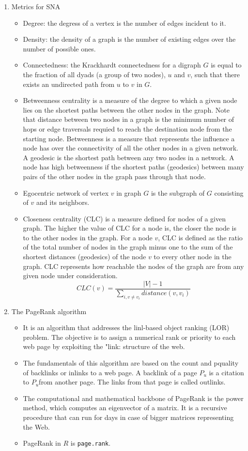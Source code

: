\documentclass[14pt]{article}
\begin{document}
\begin{enumerate}
  \item Metrics for SNA
   \begin{itemize}
    \item Degree: the degress of a vertex is the number of edges incident to it.
    \item Density: the density of a graph is the number of existing edges over the number of possible ones. 
    \item Connectedness: the Krackhardt connectedness for a digraph $G$ is equal to the fraction of all dyads (a group of two nodes), $u$ and $v$, such that there exists an undirected path from $u$ to $v$ in $G$.
    \item Betweenness centrality is a measure of the degree to which a given node lies on the shortest paths between the other nodes in the graph. Note that distance between two nodes in a graph is the minimum number of hops or edge traversals requied to reach the destination node from the starting node. Betweenness is a measure that represents the influence a node has over the connectivity of all the other nodes in a given network. A geodesic is the shortest path between any two nodes in a network. A node has high betweenness if the shortest paths (geodesics) between many pairs of the other nodes in the graph pass through that node. 
    \item Egocentric network of vertex $v$ in graph $G$ is the subgraph of $G$ consisting of $v$ and its neighbors.
    \item Closeness centrality (CLC) is a measure defined for nodes of a given graph. The higher the value of CLC for a node is, the closer the node is to the other nodes in the graph. For a node $v$, CLC is defined as the ratio of the total number of nodes in the graph minus one to the sum of the shortest distances (geodesics) of the node $v$ to every other node in the graph. CLC represents how reachable the nodes of the graph are from any given node under consideration.
    $$ CLC(v) = \frac{|V|-1}{\sum_{i,v \neq v_i} distance(v,v_i)} $$
   \end{itemize}
   
   \item The PageRank algorithm
    \begin{itemize}
     \item It is an algorithm that addresses the linl-based object ranking (LOR) problem. The objective is to assign a numerical rank or priority to each web page by exploiting the "link: structure of the web.
     \item The fundamentals of this algorithm are based on the count and pquality of backlinks or inlinks to a web page. A backlink of a page $P_u$ is a citation to $P_u$from another page. The links from that page is called outlinks. 
     \item The computational and mathematical backbone of PageRank is the power method, which computes an eigenvector of a matrix. It is a recursive procedure that can run for days in case of bigger matrices representing the Web. 
     \item PageRank in $R$ is \texttt{page.rank}. 
    \end{itemize}
    

\end{enumerate}
\end{document}
